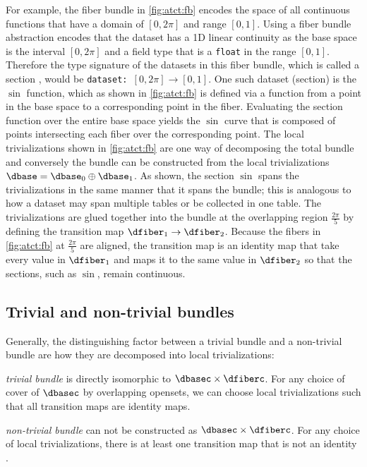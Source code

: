 \documentclass[review]{vgtc}
\theoremstyle{definition}
\theoremstyle{remark}
\begin{document}
For example, the fiber bundle in \autoref{fig:atct:fb} encodes the space of all continuous functions that have a domain of $[0, 2\pi]$ and range $[0,1]$. Using a fiber bundle abstraction encodes that the dataset has a 1D linear continuity as the base space \dbase is the interval $[0,2\pi]$ and a field type that is a \texttt{float} in the range $[0,1]$. Therefore the type signature of the datasets in this fiber bundle, which is called a section \dsection, would be \texttt{dataset: $[0, 2\pi] \rightarrow [0,1]$}. One such dataset (section) is the $\sin$ function, which as shown in \autoref{fig:atct:fb} is defined via a function \dsection from a point in the base space to a corresponding point in the fiber. Evaluating the section function over the entire base space yields the $\sin$ curve that is composed of points intersecting each fiber over the corresponding point. The local trivializations shown in \autoref{fig:atct:fb} are one way of decomposing the total bundle and conversely the bundle can be constructed from the local trivializations $\dbase = \dbase_{0} \oplus \dbase_{1}$. As shown, the section $\sin$ spans the trivializations in the same manner that it spans the bundle; this is analogous to how a dataset may span multiple tables or be collected in one table. The trivializations are glued together into the bundle at the overlapping region $\frac{2\pi}{5}$ by defining the transition map $\dfiber_{1} \rightarrow \dfiber_{2}$. Because the fibers in \autoref{fig:atct:fb} at $\frac{2\pi}{5}$ are aligned, the transition map is an identity map that take every value in $\dfiber_1$ and maps it to the same value in $\dfiber_2$ so that the sections, such as $\sin$, remain continuous.


\subsection{Trivial and non-trivial bundles}
\label{sec:appendix:bundle_triviality}

Generally, the distinguishing factor between a trivial bundle and a non-trivial bundle are how they are decomposed into local trivializations:
\begin{LaTeXdescription}
  \item[\textit{trivial bundle}] is directly isomorphic to $\dbasec\times\dfiberc$. For any choice of cover of $\dbasec$ by overlapping opensets, we can choose local trivializations such that all transition maps are identity maps.
  \item[\textit{non-trivial bundle}] can not be constructed as $\dbasec\times\dfiberc$. For any choice of local trivializations, there is at least one transition map that is not an identity \cite{hatcherAlgebraicTopology2002}.
\end{LaTeXdescription}
\end{document}
